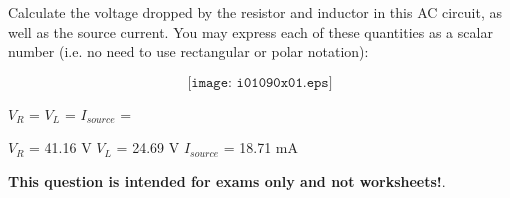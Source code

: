 

Calculate the voltage dropped by the resistor and inductor in this AC circuit, as well as the source current.  You may express each of these quantities as a scalar number (i.e. no need to use rectangular or polar notation):

$$\texttt{[image: i01090x01.eps]}$$

$V_R$ = \hskip 100pt $V_L$ = \hskip 100pt $I_{source}$ = 

\vskip 10pt







$V_R$ = 41.16 V \hskip 100pt $V_L$ = 24.69 V \hskip 100pt $I_{source}$ = 18.71 mA







{\bf This question is intended for exams only and not worksheets!}.



